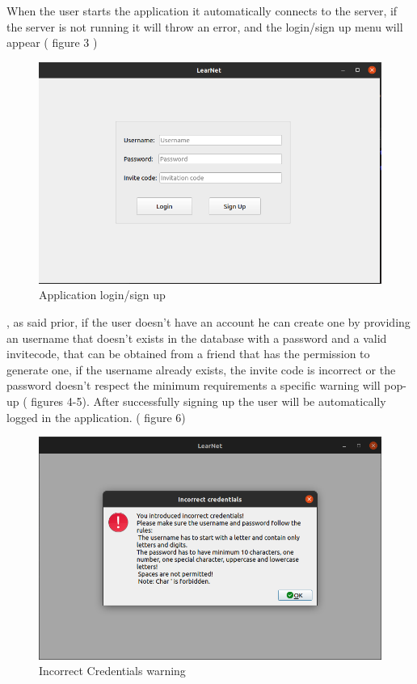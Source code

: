 \documentclass[runningheads]{llncs}
\begin{document}
\newpage
\par When the user starts the application it automatically connects to the server, if the server is not running it will throw an error, and the login/sign up menu will appear ( figure 3 )
\begin{figure}[H]
\includegraphics[width=\textwidth,height=\textheight,keepaspectratio]{images/login-signup.png}
\caption{Application login/sign up}
\end{figure}
, as said prior, if the user doesn't have an account he can create one by providing an username that doesn't exists in the database with a password and a valid invitecode, that can be obtained from a friend that has the permission to generate one, if the username already exists, the invite code is incorrect or the password doesn't respect the minimum requirements a specific warning will pop-up ( figures 4-5). After successfully signing up the user will be automatically logged in the application. ( figure 6)

\begin{figure}[H]
\includegraphics[width=\textwidth,height=\textheight,keepaspectratio]{images/incorrectCredentials.png}
\caption{Incorrect Credentials warning}
\end{figure}
\end{document}

